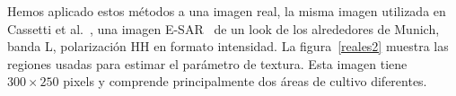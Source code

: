 %
%
%

Hemos aplicado estos métodos a una imagen real, la misma imagen utilizada en Cassetti et al.~\cite{APSAR2013ParameterEstimationStochasticDistances}, una imagen E-SAR~\cite{Horn1996} de un look de los alrededores de Munich, banda L, polarización HH en formato intensidad. La figura~\ref{reales2} muestra las regiones usadas para estimar el parámetro de textura. Esta imagen tiene $300\times250$ pixels y comprende principalmente dos áreas de cultivo diferentes.

